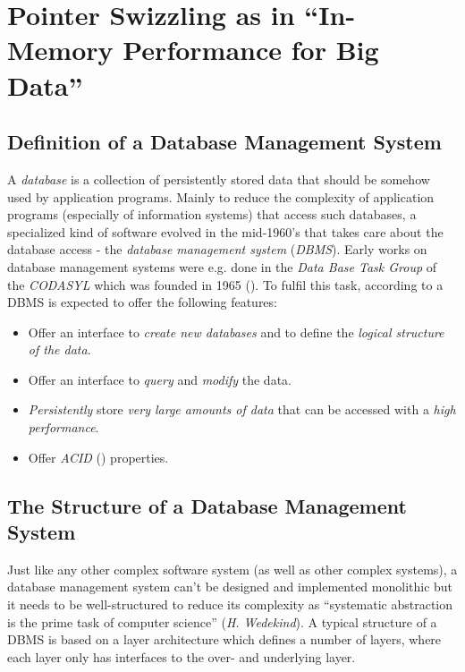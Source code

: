 \chapter[Pointer Swizzling in the DBMS Buffer Management]{Pointer Swizzling as in ``In-Memory Performance for Big Data'' \cite{Graefe:2014}} \label{ch:paper}

\section[Definition of a Database Management System]{Definition of a Database Management System}

    A \emph{database} is a collection of persistently stored data that should be somehow used by application programs. Mainly to reduce the complexity of application programs (especially of information systems) that access such databases, a specialized kind of software evolved in the mid-1960's that takes care about the database access - the \emph{database management system} (\emph{DBMS}). Early works on database management systems were e.g. done in the \emph{Data Base Task Group} of the \emph{CODASYL} which was founded in 1965 (\cite{wikipedia.En_Data_Base_Task_Group}). To fulfil this task, according to \cite{Database_Systems_-_The_Complete_Book} a DBMS is expected to offer the following features:
    \begin{itemize}
        \item Offer an interface to \emph{create new databases} and to define the \emph{logical structure of the data}.
        \item Offer an interface to \emph{query} and \emph{modify} the data.
        \item \emph{Persistently} store \emph{very large amounts of data} that can be accessed with a \emph{high performance}.
        \item Offer \emph{ACID} (\cite{HaerderReuter83}) properties.
    \end{itemize}

\section[Structure of a DBMS]{The Structure of a Database Management System}

    Just like any other complex software system (as well as other complex systems), a database management system can't be designed and implemented monolithic but it needs to be well-structured to reduce its complexity as ``systematic abstraction is the prime task of computer science'' (\emph{H. Wedekind}). A typical structure of a DBMS is based on a layer architecture which defines a number of layers, where each layer only has interfaces to the over- and underlying layer.

